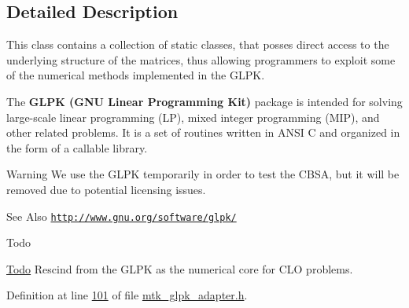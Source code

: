 \subsection{Detailed Description}
This class contains a collection of static classes, that posses direct access to the underlying structure of the matrices, thus allowing programmers to exploit some of the numerical methods implemented in the G\-L\-P\-K.

The {\bfseries G\-L\-P\-K (G\-N\-U Linear Programming Kit)} package is intended for solving large-\/scale linear programming (L\-P), mixed integer programming (M\-I\-P), and other related problems. It is a set of routines written in A\-N\-S\-I C and organized in the form of a callable library.

\begin{DoxyWarning}{Warning}
We use the G\-L\-P\-K temporarily in order to test the C\-B\-S\-A, but it will be removed due to potential licensing issues.
\end{DoxyWarning}
\begin{DoxySeeAlso}{See Also}
\href{http://www.gnu.org/software/glpk/}{\tt http\-://www.\-gnu.\-org/software/glpk/}
\end{DoxySeeAlso}
\begin{DoxyRefDesc}{Todo}
\item[\hyperlink{todo__todo000002}{Todo}]Rescind from the G\-L\-P\-K as the numerical core for C\-L\-O problems. \end{DoxyRefDesc}


Definition at line \hyperlink{mtk__glpk__adapter_8h_source_l00101}{101} of file \hyperlink{mtk__glpk__adapter_8h_source}{mtk\-\_\-glpk\-\_\-adapter.\-h}.




